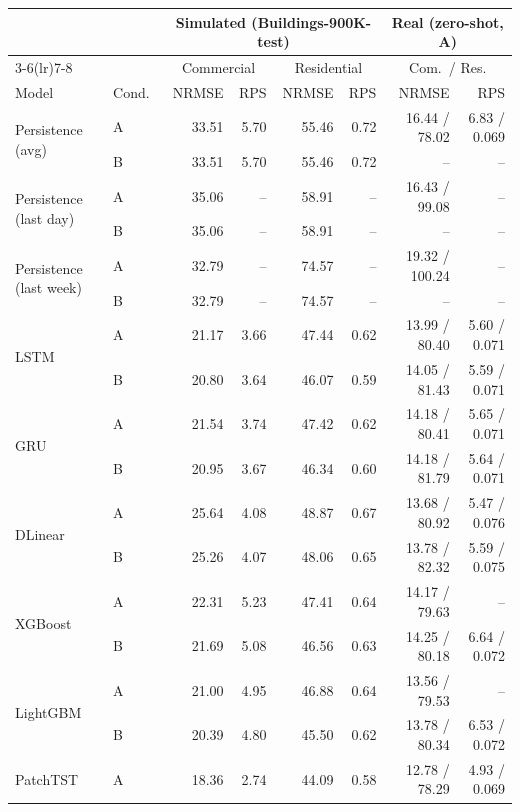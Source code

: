 \documentclass[11pt]{article}
\begin{document}
\begin{table}[H]
\centering
\small
\begin{tabular}{ll rr rr rr}
\toprule
& & \multicolumn{4}{c}{\textbf{Simulated (Buildings-900K-test)}} & \multicolumn{2}{c}{\textbf{Real (zero-shot, A)}} \\
\cmidrule(lr){3-6}\cmidrule(lr){7-8}
& & \multicolumn{2}{c}{Commercial} & \multicolumn{2}{c}{Residential} & \multicolumn{2}{c}{Com.\ / Res.} \\
Model & Cond.\ & NRMSE & RPS & NRMSE & RPS & NRMSE & RPS \\
\midrule
\multirow{2}{*}{Persistence (avg)}
     & A & 33.51 & 5.70 & 55.46 & 0.72 & 16.44 / 78.02 & 6.83 / 0.069 \\
     & B & 33.51 & 5.70 & 55.46 & 0.72 & -- & -- \\
\multirow{2}{*}{Persistence (last day)}
     & A & 35.06 & -- & 58.91 & -- & 16.43 / 99.08 & -- \\
     & B & 35.06 & -- & 58.91 & -- & -- & -- \\
\multirow{2}{*}{Persistence (last week)}
     & A & 32.79 & -- & 74.57 & -- & 19.32 / 100.24 & -- \\
     & B & 32.79 & -- & 74.57 & -- & -- & -- \\
\midrule
\multirow{2}{*}{LSTM}
     & A & 21.17 & 3.66 & 47.44 & 0.62 & 13.99 / 80.40 & 5.60 / 0.071 \\
     & B & 20.80 & 3.64 & 46.07 & 0.59 & 14.05 / 81.43 & 5.59 / 0.071 \\
\multirow{2}{*}{GRU}
     & A & 21.54 & 3.74 & 47.42 & 0.62 & 14.18 / 80.41 & 5.65 / 0.071 \\
     & B & 20.95 & 3.67 & 46.34 & 0.60 & 14.18 / 81.79 & 5.64 / 0.071 \\
\multirow{2}{*}{DLinear}
     & A & 25.64 & 4.08 & 48.87 & 0.67 & 13.68 / 80.92 & 5.47 / 0.076 \\
     & B & 25.26 & 4.07 & 48.06 & 0.65 & 13.78 / 82.32 & 5.59 / 0.075 \\
\multirow{2}{*}{XGBoost}
     & A & 22.31 & 5.23 & 47.41 & 0.64 & 14.17 / 79.63 & -- \\
     & B & 21.69 & 5.08 & 46.56 & 0.63 & 14.25 / 80.18 & 6.64 / 0.072 \\
\multirow{2}{*}{LightGBM}
     & A & 21.00 & 4.95 & 46.88 & 0.64 & 13.56 / 79.53 & -- \\
     & B & 20.39 & 4.80 & 45.50 & 0.62 & 13.78 / 80.34 & 6.53 / 0.072 \\
\multirow{2}{*}{PatchTST}
     & A & 18.36 & 2.74 & 44.09 & 0.58 & 12.78 / 78.29 & 4.93 / 0.069 \\

\end{tabular}
\end{table}
\end{document}
